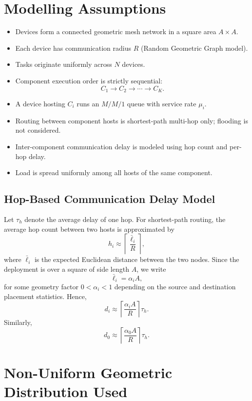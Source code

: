 \documentclass[12pt,a4paper]{article}
\begin{document}
\newpage

\section{Modelling Assumptions}

\begin{itemize}
    \item Devices form a connected geometric mesh network in a square area $A\times A$.
    \item Each device has communication radius $R$ (Random Geometric Graph model).
    \item Tasks originate uniformly across $N$ devices.
    \item Component execution order is strictly sequential:
    \[
    C_1 \rightarrow C_2 \rightarrow \cdots \rightarrow C_K.
    \]
    \item A device hosting $C_i$ runs an $M/M/1$ queue with service rate $\mu_i$.
    \item Routing between component hosts is shortest-path multi-hop only; flooding is not considered.
    \item Inter-component communication delay is modeled using hop count and per-hop delay.
    \item Load is spread uniformly among all hosts of the same component.
\end{itemize}

\subsection{Hop-Based Communication Delay Model}
Let $\tau_h$ denote the average delay of one hop. For shortest-path routing, the average hop count between two hosts is approximated by
\[
h_i \approx \left\lceil \frac{\bar{\ell}_i}{R} \right\rceil,
\]
where $\bar{\ell}_i$ is the expected Euclidean distance between the two nodes. Since the deployment is over a square of side length $A$, we write
\[
\bar{\ell}_i = \alpha_i A,
\]
for some geometry factor $0<\alpha_i<1$ depending on the source and destination placement statistics. Hence,
\[
d_i \approx \left\lceil \frac{\alpha_i A}{R} \right\rceil \tau_h.
\]
Similarly,
\[
d_0 \approx \left\lceil \frac{\alpha_0 A}{R} \right\rceil \tau_h.
\]

\section{Non-Uniform Geometric Distribution Used}
\end{document}
